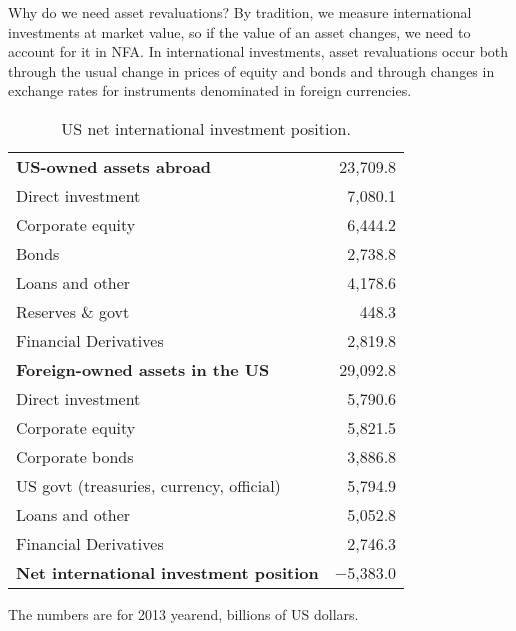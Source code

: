 Why do we need asset revaluations?  By tradition, we
measure international investments at market value, so if the value
of an asset changes, we need to account for it in NFA.
In international investments, asset revaluations occur both through the usual change in
prices of equity and bonds and through changes in exchange rates
for instruments denominated in foreign currencies.


\begin{table}
\centering
\caption{US net international investment position.}
\begin{tabular*}{0.8\textwidth}{l@{\extracolsep{\fill}}r}
\toprule
{\bf US-owned assets abroad}            &  23,709.8 \\
\hspace{5mm}Direct investment           &  7,080.1 \\
\hspace{5mm}Corporate equity            &  6,444.2 \\
\hspace{5mm}Bonds\index{bond}           &  2,738.8 \\
\hspace{5mm}Loans and other             &  4,178.6 \\
\hspace{5mm}Reserves \& govt            &  448.3 \\
\hspace{5mm}Financial Derivatives       & 2,819.8 \\
\addlinespace
{\bf Foreign-owned assets in the US}    & 29,092.8 \\
\hspace{5mm}Direct investment           & 5,790.6 \\
\hspace{5mm}Corporate equity            & 5,821.5  \\
\hspace{5mm}Corporate bonds\index{bond} &  3,886.8 \\
\hspace{5mm}US govt (treasuries, currency, official) &  5,794.9  \\
\hspace{5mm}Loans and other             &  5,052.8      \\
\hspace{5mm}Financial Derivatives       & 2,746.3 \\
\addlinespace
{\bf Net international investment position} &  $-$5,383.0  \\
\bottomrule
\end{tabular*}
\begin{minipage}{0.8\textwidth}
\footnotesize{%
\smallskip
The numbers are for 2013 yearend, billions of US dollars.}
\end{minipage}
\label{tab:usniip}
\end{table}


